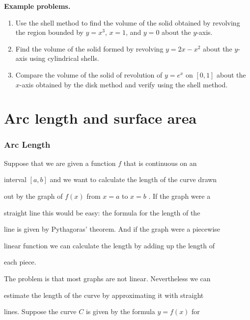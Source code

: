 \textbf{Example problems.}

\begin{enumerate}
    \item Use the shell method to find the volume of the solid obtained by revolving the region bounded by $y = x^3$, $x=1$, and $y=0$ about the $y$-axis.
    \item Find the volume of the solid formed by revolving $y = 2x - x^2$ about the $y$-axis using cylindrical shells.
    \item Compare the volume of the solid of revolution of $y=e^x$ on $[0,1]$ about the $x$-axis obtained by the disk method and verify using the shell method.
\end{enumerate}

\section{Arc length and surface area}
\label{sec:arcl-0676}


\subsubsection{Arc Length}
\label{sss:arcl-e028}


Suppose that we are given a function $f$ that is continuous on an

interval $[a,b]$ and we want to calculate the length of the curve drawn

out by the graph of $f(x)$ from $x=a$ to $x=b$ . If the graph were a

straight line this would be easy: the formula for the length of the

line is given by Pythagoras' theorem. And if the graph were a piecewise

linear function we can calculate the length by adding up the length of

each piece.


The problem is that most graphs are not linear. Nevertheless we can

estimate the length of the curve by approximating it with straight

lines. Suppose the curve $C$ is given by the formula $y=f(x)$ for

